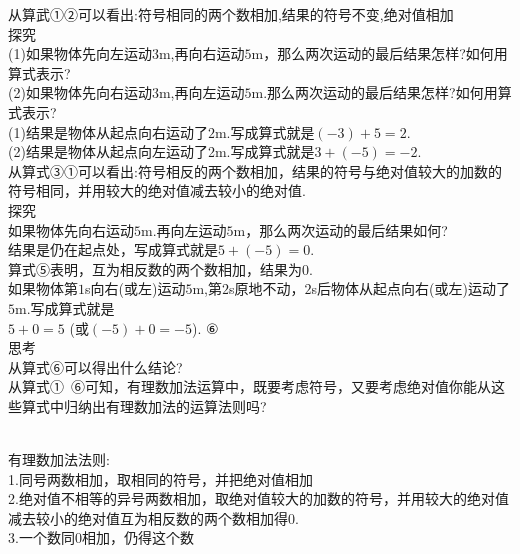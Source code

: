 \documentclass{article}
\begin{document}
从算武①②可以看出:符号相同的两个数相加,结果的符号不变,绝对值相加\\

探究\\

(1)如果物体先向左运动$3$m,再向右运动$5$m，那么两次运动的最后结果怎样?如何用算式表示?\\ 
(2)如果物体先向右运动$3$m,再向左运动$5$m.那么两次运动的最后结果怎样?如何用算式表示?\\

(1)结果是物体从起点向右运动了$2$m.写成算式就是$(-3)+5=2$.\\
(2)结果是物体从起点向左运动了2m.写成算式就是$3+(-5)=-2$.\\

从算式③①可以看出:符号相反的两个数相加，结果的符号与绝对值较大的加数的符号相同，并用较大的绝对值减去较小的绝对值.\\

探究\\

如果物体先向右运动$5$m.再向左运动$5$m，那么两次运动的最后结果如何?\\

结果是仍在起点处，写成算式就是$5+(-5)=0$.\\

算式⑤表明，互为相反数的两个数相加，结果为0.\\

如果物体第$1$s向右(或左)运动$5$m,第$2$s原地不动，$2$s后物体从起点向右(或左)运动了$5$m.写成算式就是\\

$5+0=5$ (或$(-5)+0= -5$).  ⑥\\

思考\\

从算式⑥可以得出什么结论?\\

从算式①~⑥可知，有理数加法运算中，既要考虑符号，又要考虑绝对值你能从这些算式中归纳出有理数加法的运算法则吗?\\


\begin{propertory}\\
有理数加法法则:\\

1.同号两数相加，取相同的符号，并把绝对值相加\\

2.绝对值不相等的异号两数相加，取绝对值较大的加数的符号，并用较大的绝对值减去较小的绝对值互为相反数的两个数相加得0.\\

3.一个数同0相加，仍得这个数\\
\end{propertory}\\
\end{document}
